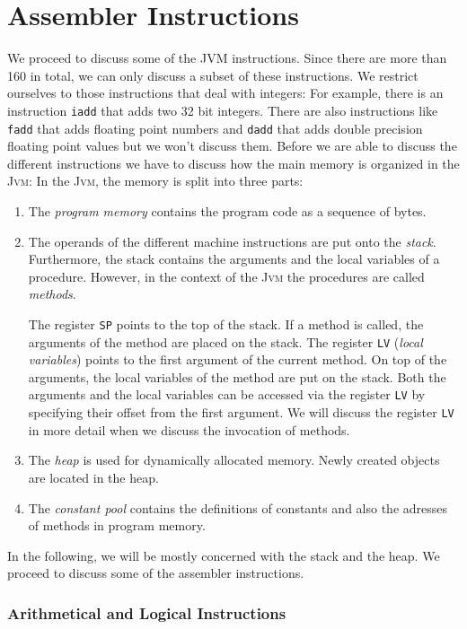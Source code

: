 \section{Assembler Instructions}
We proceed to discuss some of the \textsc{JVM} instructions.  Since there are more than 160 in
total, we can only discuss a subset of these instructions.  We restrict ourselves to those
instructions that deal with integers:  For example, there is an instruction \texttt{iadd} that adds
two 32 bit integers.  There are also instructions like \texttt{fadd} that adds floating point
numbers and \texttt{dadd} that adds double precision floating point values but we won't discuss
them.  Before we are able to discuss the different instructions we have to discuss how the main
memory is organized in the \textsc{Jvm}: In the \textsc{Jvm}, the memory is split into three parts:
\begin{enumerate}
\item The \emph{program memory} contains the program code as a sequence of bytes.
\item The operands of the different machine instructions are put onto the \emph{stack}.
      Furthermore, the stack contains the arguments and the local variables of a procedure.
      However, in the context of the \textsc{Jvm} the procedures are called \emph{methods}.

      The register \texttt{SP} points to the top of the stack.
      If a method is called, the arguments of the method are placed on the stack.  
      The register \texttt{LV} (\emph{local variables}) points to the first argument of the current  
      method.    On top of the arguments, the local variables of the method are put on the stack.
      Both the arguments and the local variables can be accessed via the register \texttt{LV}
      by specifying their offset from the first argument.
      We will discuss the register \texttt{LV} in more detail when we discuss the invocation of methods. 
\item The \emph{heap} is used for dynamically allocated memory.  Newly created objects are
      located in the heap.
\item The \emph{constant pool} contains the definitions of constants and also the adresses of
      methods in program memory.
\end{enumerate}
In the following, we will be mostly concerned with the stack and the heap.
We proceed to discuss some of the assembler instructions.

\subsubsection{Arithmetical and Logical Instructions}

